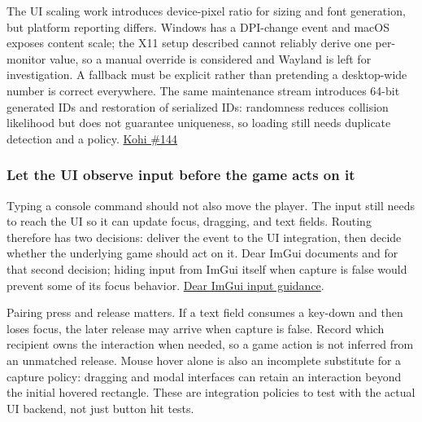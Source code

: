 \hypertarget{05-engine-i-ch013-display-scale-and-persistent-identity-need-explicit-platform-policies}{}

The UI scaling work introduces device-pixel ratio for sizing and font generation, but platform reporting differs. Windows has a DPI-change event and macOS exposes content scale; the X11 setup described cannot reliably derive one per-monitor value, so a manual override is considered and Wayland is left for investigation. A fallback must be explicit rather than pretending a desktop-wide number is correct everywhere. The same maintenance stream introduces 64-bit generated IDs and restoration of serialized IDs: randomness reduces collision likelihood but does not guarantee uniqueness, so loading still needs duplicate detection and a policy. \href{https://www.youtube.com/watch?v=YCYZtc2PrtY}{Kohi \#144}

\subsubsection{Let the UI observe input before the game acts on it}\label{05-engine-i-ch013-let-the-ui-observe-input-before-the-game-acts-on-it}

\hypertarget{05-engine-i-ch013-let-the-ui-observe-input-before-the-game-acts-on-it}{}

Typing a console command should not also move the player. The input still needs to reach the UI so it can update focus, dragging, and text fields. Routing therefore has two decisions: deliver the event to the UI integration, then decide whether the underlying game should act on it. Dear ImGui documents  and  for that second decision; hiding input from ImGui itself when capture is false would prevent some of its focus behavior. \href{https://github.com/ocornut/imgui/blob/master/docs/FAQ.md\#q-how-can-i-tell-whether-to-dispatch-mousekeyboard-to-dear-imgui-or-my-application}{Dear ImGui input guidance}.

Pairing press and release matters. If a text field consumes a key-down and then loses focus, the later release may arrive when capture is false. Record which recipient owns the interaction when needed, so a game action is not inferred from an unmatched release. Mouse hover alone is also an incomplete substitute for a capture policy: dragging and modal interfaces can retain an interaction beyond the initial hovered rectangle. These are integration policies to test with the actual UI backend, not just button hit tests.


